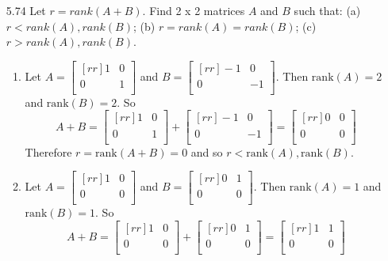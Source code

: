 \documentclass[12pt]{article}
\begin{document}
\begin{enumerate}
\item[5.74] Let $r=rank(A+B)$. Find 2 x 2 matrices $A$ and $B$ such that: (a) $r<rank(A),rank(B)$; (b) $r=rank(A)=rank(B)$; (c) $r>rank(A),rank(B)$.
	\begin{enumerate}
	\item Let $A=\begin{bmatrix}[rr]1&0\\0&1\\\end{bmatrix}$ and $B=\begin{bmatrix}[rr]-1&0\\0&-1\\\end{bmatrix}$. Then $\mathrm{rank}(A)=2$ and $\mathrm{rank}(B) = 2$. So
	\[ A+B = \begin{bmatrix}[rr]1&0\\0&1\\\end{bmatrix}+\begin{bmatrix}[rr]-1&0\\0&-1\\\end{bmatrix} = \begin{bmatrix}[rr]0&0\\0&0\\\end{bmatrix} \]
	Therefore $r = \mathrm{rank}(A+B) = 0$ and so $r<\mathrm{rank}(A),\mathrm{rank}(B)$.
	\item Let $A=\begin{bmatrix}[rr]1&0\\0&0\\\end{bmatrix}$ and $B=\begin{bmatrix}[rr]0&1\\0&0\\\end{bmatrix}$. Then $\mathrm{rank}(A) = 1$ and $\mathrm{rank}(B) = 1$. So
	\[ A+B = \begin{bmatrix}[rr]1&0\\0&0\\\end{bmatrix}+\begin{bmatrix}[rr]0&1\\0&0\\\end{bmatrix} = \begin{bmatrix}[rr]1&1\\0&0\\\end{bmatrix} \]

\end{enumerate}
\end{enumerate}
\end{document}

